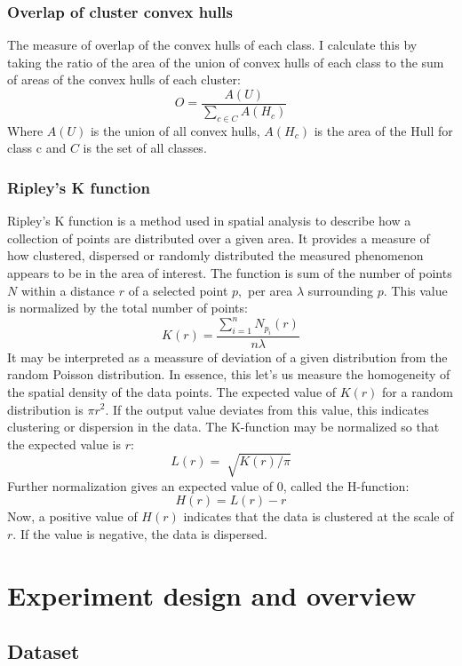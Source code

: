 \documentclass[a4paper, 12pt, twoside]{report}
\begin{document}
\subsection{Overlap of cluster convex hulls}
\label{sec:org274a5d2}

The measure of overlap of the convex hulls of each class. I calculate this by taking the ratio of the area of the union of convex hulls of each class to the sum of areas of the convex hulls of each cluster:
\[ O = \frac{A(U)}{\sum_{c \in C}A(H_{c})} \]
Where \(A(U)\) is the union of all convex hulls, \(A(H_{c})\) is the area of the Hull for class c and \(C\) is the set of all classes.
\subsection{Ripley's K function}
\label{sec:org533d625}

Ripley's K function is a method used in spatial analysis to describe how a collection of points are distributed over a given area. It provides a measure of how clustered, dispersed or randomly distributed the measured phenomenon appears to be in the area of interest. The function is sum of the number of points $N$ within a distance $r$ of a selected point $p,$ per area \(\lambda\) surrounding $p.$ This value is normalized by the total number of points:
\[K(r) = \frac{\sum_{i=1}^{n}N_{p_{i}}(r)}{n \lambda}\]
It may be interpreted as a meassure of deviation of a given distribution from the random Poisson distribution. In essence, this let's us measure the homogeneity of the spatial density of the data points. The expected value of \(K(r)\) for a random distribution is \(\pi r^{2}\). If the output value deviates from this value, this indicates clustering or dispersion in the data. The K-function may be normalized so that the expected value is $r$:
\[L(r) = \sqrt[]{K(r)/\pi}\]
Further normalization gives an expected value of 0, called the H-function:
\[H(r) = L(r) - r\]
Now, a positive value of \(H(r)\) indicates that the data is clustered at the scale of $r$. If the value is negative, the data is dispersed.

\newpage

\chapter{Experiment design and overview}
\label{sec:orga220b5b}
\section{Dataset}
\label{sec:orgac308b8}
\end{document}

